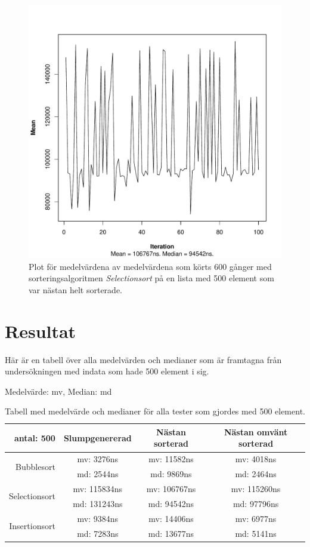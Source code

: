 \documentclass[a4paper]{article}
\begin{document}
\begin{figure}[H]
	\begin{center}
		\includegraphics[scale=0.4]{output/500/AlmostSorted/selectionSort_almost_sorted_500_600_100.pdf}
		\caption{Plot för medelvärdena av medelvärdena som körts 600 gånger med sorteringsalgoritmen \emph{Selectionsort} på en lista med 500 element som var nästan helt sorterade.}
		\label{selectionSort}
	\end{center}
\end{figure}

\section{Resultat}
Här är en tabell över alla medelvärden och medianer som är framtagna från undersökningen med indata som hade 500 element i sig. 

Medelvärde: mv, Median: md 
\begin{table}[H]
	\begin{tabular}{r|c|c|c|}
		antal: 500 & Slumpgenererad & Nästan sorterad & Nästan omvänt sorterad \\ \hline
		\multirow{2}{*}{Bubblesort}    & mv: 3276ns & mv: 11582ns & mv: 4018ns \\
		                               & md: 2544ns & md: 9869ns & md: 2464ns \\ \hline
		\multirow{2}{*}{Selectionsort} & mv: 115834ns & mv: 106767ns & mv: 115260ns \\
		                               & md: 131243ns & md: 94542ns & md: 97796ns \\ \hline
		\multirow{2}{*}{Insertionsort} & mv: 9384ns & mv: 14406ns & mv: 6977ns \\
		                               & md: 7283ns & md: 13677ns & md: 5141ns \\ \hline	
	\end{tabular}
	\caption{Tabell med medelvärde och medianer för alla tester som gjordes med 500 element.}
	\label{Tabel500}
\end{table}
\end{document}
